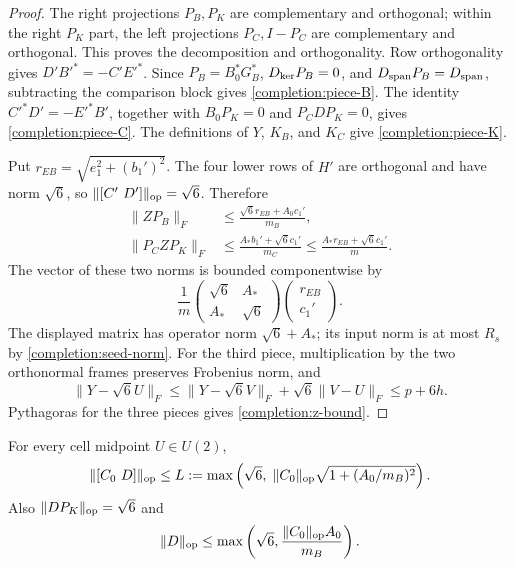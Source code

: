 \begin{proof}
The right projections $P_B,P_K$ are complementary and orthogonal; within
the right $P_K$ part, the left projections $P_C,I-P_C$ are complementary
and orthogonal.  This proves the decomposition and orthogonality.
Row orthogonality gives $D'B'^*=-C'E'^*$.  Since
$P_B=B_0^*G_B^*$, $D_{\rm ker}P_B=0$, and
$D_{\rm span}P_B=D_{\rm span}$, subtracting the comparison block gives
\eqref{completion:piece-B}.  The identity
$C'^*D'=-E'^*B'$, together with $B_0P_K=0$ and
$P_CD P_K=0$, gives \eqref{completion:piece-C}.
The definitions of $Y$, $K_B$, and $K_C$ give
\eqref{completion:piece-K}.

Put $r_{EB}=\sqrt{e_1^2+(b_1')^2}$.  The four lower rows of $H'$ are
orthogonal and have norm $\sqrt6$, so
$\lVert[C'\ D']\rVert_{\rm op}=\sqrt6$.  Therefore
\begin{align*}
 \lVert ZP_B\rVert_F
 &\le\frac{\sqrt6 r_{EB}+A_0c_1'}{m_B},\\
 \lVert P_CZP_K\rVert_F
 &\le\frac{A_*b_1'+\sqrt6 c_1'}{m_C}
 \le\frac{A_*r_{EB}+\sqrt6 c_1'}m.
\end{align*}
The vector of these two norms is bounded componentwise by
\[
 \frac1m
 \begin{pmatrix}\sqrt6&A_*\\ A_*&\sqrt6\end{pmatrix}
 \begin{pmatrix}r_{EB}\\c_1'\end{pmatrix}.
\]
The displayed matrix has operator norm $\sqrt6+A_*$; its input norm is at
most $R_s$ by \eqref{completion:seed-norm}.
For the third piece, multiplication by the two orthonormal frames preserves
Frobenius norm, and
\[
 \lVert Y-\sqrt6 U\rVert_F
 \le\lVert Y-\sqrt6 V\rVert_F+\sqrt6\lVert V-U\rVert_F
 \le p+6h.
\]
Pythagoras for the three pieces gives \eqref{completion:z-bound}.
\end{proof}

\begin{lemma}
\label{completion:L-bound}
For every cell midpoint $U\in U(2)$,
\begin{equation}
\label{completion:L-definition}
 \lVert[C_0\ D]\rVert_{\rm op}\le
 L:=\max\left(\sqrt6,\;
 \lVert C_0\rVert_{\rm op}\sqrt{1+(A_0/m_B)^2}\right).
\end{equation}
Also $\lVert DP_K\rVert_{\rm op}=\sqrt6$ and
\begin{equation}
\label{completion:D-operator-bound}
 \lVert D\rVert_{\rm op}
 \le\max\left(\sqrt6,\frac{\lVert C_0\rVert_{\rm op}A_0}{m_B}\right).
\end{equation}
\end{lemma}

